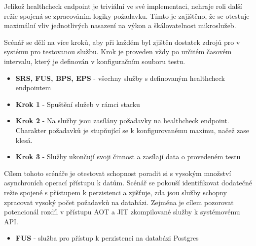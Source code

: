 Jelikož healthcheck endpoint je triviální ve své implementaci, nehraje roli další režie spojená se zpracováním logiky požadavku. Tímto je zajištěno, že se otestuje maximální vliv jednotlivých nasazení na výkon a škálovatelnost mikroslužeb.

Scénář se dělí na více kroků, aby při každém byl zjištěn dostatek zdrojů pro v systému pro testovanou službu. Krok je proveden vždy po určitém časovém intervalu, který je definován v konfiguračním souboru testu.



\begin{itemize}
    \item \textbf{SRS, FUS, BPS, EPS} - všechny služby s definovaným healthcheck endpointem
\end{itemize}


\begin{itemize}
    \item \textbf{Krok 1} - Spuštění služeb v rámci stacku
    \item \textbf{Krok 2} - Na služby jsou zasílány požadavky na healthcheck endpoint. Charakter požadavků je stupňující se k konfigurovanému maximu, načež zase klesá.
    \item \textbf{Krok 3} - Služby ukončují svoji činnost a zasílají data o provedeném testu
\end{itemize}


Cílem tohoto scénáře je otestovat schopnost poradit si s vysokým množství asynchroních operací přístupu k datům. Scénář se pokouší identifikovat dodatečné režie spojené s přístupem k perzistenci a zjišťuje, zda jsou služby schopny zpracovat vysoký počet požadavků na databázi. Zejména je cílem pozorovat potencionál rozdíl v přístupu AOT a JIT zkompilované služby k systémovému API.



\begin{itemize}
    \item \textbf{FUS} - služba pro přístup k perzistenci na databázi Postgres
\end{itemize}

